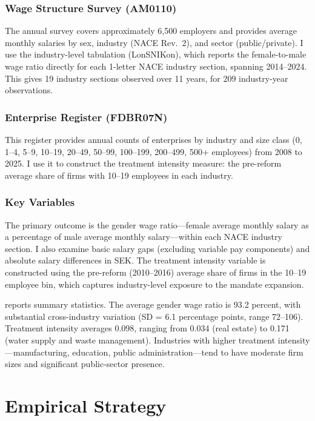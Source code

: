 \documentclass[12pt]{article}
\begin{document}
\subsubsection*{Wage Structure Survey (AM0110)} The annual survey covers approximately 6,500 employers and provides average monthly salaries by sex, industry (NACE Rev.~2), and sector (public/private). I use the industry-level tabulation (LonSNIKon), which reports the female-to-male wage ratio directly for each 1-letter NACE industry section, spanning 2014--2024. This gives 19 industry sections observed over 11 years, for 209 industry-year observations.

\subsubsection*{Enterprise Register (FDBR07N)} This register provides annual counts of enterprises by industry and size class (0, 1--4, 5--9, 10--19, 20--49, 50--99, 100--199, 200--499, 500+ employees) from 2008 to 2025. I use it to construct the treatment intensity measure: the pre-reform average share of firms with 10--19 employees in each industry.

\subsubsection*{Key Variables} The primary outcome is the gender wage ratio---female average monthly salary as a percentage of male average monthly salary---within each NACE industry section. I also examine basic salary gaps (excluding variable pay components) and absolute salary differences in SEK. The treatment intensity variable is constructed using the pre-reform (2010--2016) average share of firms in the 10--19 employee bin, which captures industry-level exposure to the mandate expansion.



 reports summary statistics. The average gender wage ratio is 93.2 percent, with substantial cross-industry variation (SD = 6.1 percentage points, range 72--106). Treatment intensity averages 0.098, ranging from 0.034 (real estate) to 0.171 (water supply and waste management). Industries with higher treatment intensity---manufacturing, education, public administration---tend to have moderate firm sizes and significant public-sector presence.

\section{Empirical Strategy}
\label{sec:strategy}
\end{document}
